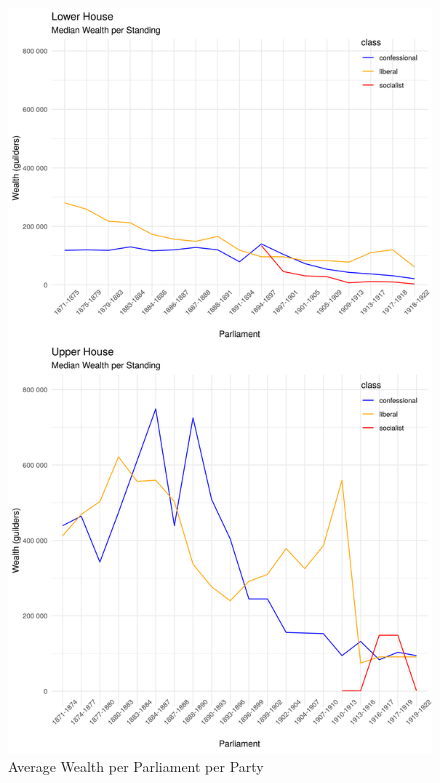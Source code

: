 \begin{figure}
    \centering
    \includegraphics[scale=0.60]{figures/step8fig2wealthperparlperparty.png}
    \caption{Average Wealth per Parliament per Party}
    \label{fig:avgwealthtimeparty}
\end{figure}
\clearpage

